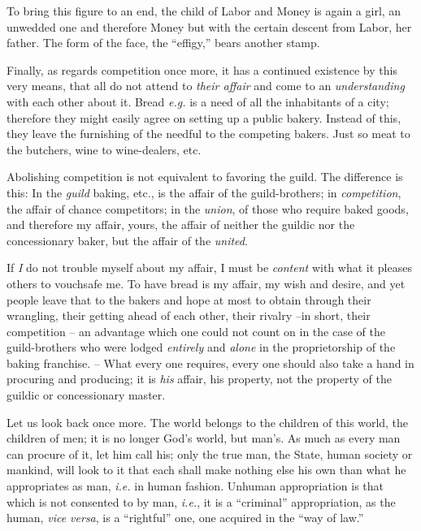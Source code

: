 \documentclass[12pt,a4paper]{book}
\begin{document}
To bring this figure to an end, the child of Labor and Money is again a girl, 
an unwedded one and therefore Money but with the certain descent from Labor, 
her father. The form of the face, the ``effigy,'' bears another stamp.

Finally, as regards competition once more, it has a continued existence by 
this very means, that all do not attend to \textit{their affair} and come to 
an \textit{understanding} with each other about it. Bread \textit{e.g.} is a 
need of all the inhabitants of a city; therefore they might easily agree on 
setting up a public bakery. Instead of this, they leave the furnishing of the 
needful to the competing bakers. Just so meat to the butchers, wine to 
wine-dealers, etc.

Abolishing competition is not equivalent to favoring the guild. The difference 
is this: In the \textit{guild} baking, etc., is the affair of the 
guild-brothers; in \textit{competition}, the affair of chance competitors; in 
the \textit{union}, of those who require baked goods, and therefore my affair, 
yours, the affair of neither the guildic nor the concessionary baker, but the 
affair of the \textit{united}.

If \textit{I} do not trouble myself about my affair, I must be 
\textit{content} with what it pleases others to vouchsafe me. To have bread is 
my affair, my wish and desire, and yet people leave that to the bakers and 
hope at most to obtain through their wrangling, their getting ahead of each 
other, their rivalry --in short, their competition -- an advantage which one 
could not count on in the case of the guild-brothers who were lodged 
\textit{entirely} and \textit{alone} in the proprietorship of the baking 
franchise. -- What every one requires, every one should also take a hand in 
procuring and producing; it is \textit{his} affair, his property, not the 
property of the guildic or concessionary master.

Let us look back once more. The world belongs to the children of this world, 
the children of men; it is no longer God's world, but man's. As much as every 
man can procure of it, let him call his; only the true man, the State, human 
society or mankind, will look to it that each shall make nothing else his own 
than what he appropriates as man, \textit{i.e.} in human fashion. Unhuman 
appropriation is that which is not consented to by man, \textit{i.e.}, it is a 
``criminal'' appropriation, as the human, \textit{vice versa}, is a 
``rightful'' one, one acquired in the ``way of law.''
\end{document}

